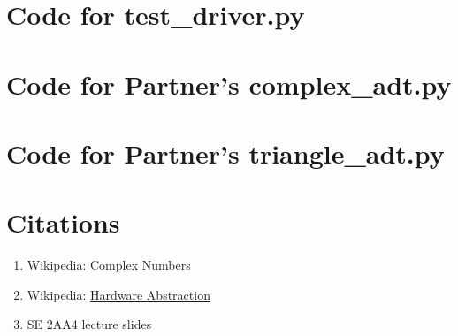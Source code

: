 \documentclass[12pt]{article}
\begin{document}
\noindent 

\newpage

\section{Code for test\_driver.py}

\noindent 

\newpage

\section{Code for Partner's complex\_adt.py}

\noindent 

\section{Code for Partner's triangle\_adt.py}

\noindent 

\newpage

\section{Citations}

\begin{enumerate}

\item Wikipedia: \href{https://en.wikipedia.org/wiki/Complex_number}{Complex Numbers}
\item Wikipedia: \href{https://en.wikipedia.org/wiki/Hardware_abstraction}{Hardware Abstraction}
\item SE 2AA4 lecture slides

\end{enumerate}
\end{document}
